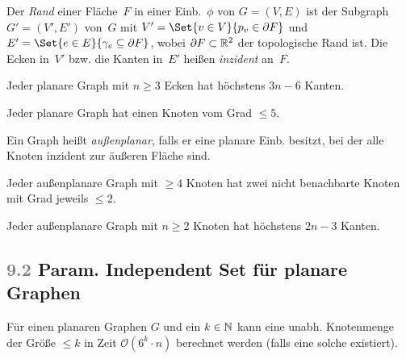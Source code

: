 \documentclass{cheat-sheet}
\renewcommand{\O}{\mathcal{O}} %
\newcommand{\boundary}{\partial} %
\newcommand{\Youtube}[1]{\href{https://www.youtube.com/watch?v=#1}{\textcolor{YoutubeColor}{$\blacktriangleright$}}}
\newcommand{\Problem}[1]{\textcolor{ProblemColor}{\textbf{#1}}}
\newcommand{\scriptSection}[1]{\textcolor{gray}{#1}\enspace}
\begin{document}
\begin{defn}
  Der \emph{Rand} einer Fläche~$F$ in einer Einb.~$\phi$ von $G = (V, E)$ ist der Subgraph $G' = (V', E')$ von~$G$ mit $V' = \Set{v \in V}{p_v \in \boundary{F}}$ und $E' = \Set{e \in E}{\gamma_e \subseteq \boundary{F}}$, wobei $\boundary F \subset \R^2$ der topologische Rand ist.
  Die Ecken in~$V'$ bzw. die Kanten in~$E'$ heißen \emph{inzident} an~$F$.
\end{defn}

\begin{lem}[\Youtube{_d_6JvceAwE}]
  \begin{minipage}[t]{0.75 \linewidth}
    Jeder planare Graph mit $n \geq 3$ Ecken hat höchstens $3 n - 6$ Kanten.
  \end{minipage}
\end{lem}

\begin{kor}
  Jeder planare Graph hat einen Knoten vom Grad $\leq 5$.
\end{kor}

\begin{defn}
  Ein Graph heißt \emph{außenplanar}, falls er eine planare Einb. besitzt, bei der alle Knoten inzident zur äußeren Fläche sind.
\end{defn}

\begin{lem}
  \begin{minipage}[t]{0.8 \linewidth}
    Jeder außenplanare Graph mit $\geq 4$ Knoten hat zwei nicht benachbarte Knoten mit Grad jeweils $\leq 2$.
  \end{minipage}
\end{lem}

\begin{lem}
  \begin{minipage}[t]{0.72 \linewidth}
    Jeder außenplanare Graph mit $n \geq 2$ Knoten hat höchstens $2 n - 3$ Kanten.
  \end{minipage}
\end{lem}

\subsection{\scriptSection{9.2} Param. \Problem{Independent Set} für planare Graphen}

\begin{satz}
  Für einen planaren Graphen $G$ und ein $k \in \mathbb{N}$ kann eine unabh. Knotenmenge der Größe $\leq k$ in Zeit $\O(6^k \cdot n)$ berechnet werden (falls eine solche existiert).
\end{satz}
\end{document}
